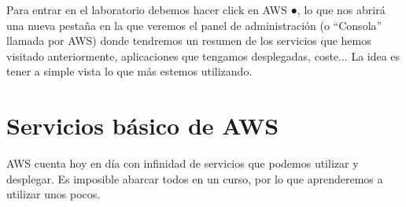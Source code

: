 Para entrar en el laboratorio debemos hacer click en {AWS \color{green}●}, lo que nos abrirá una nueva pestaña en la que veremos el panel de administración (o “Consola” llamada por AWS) donde tendremos un resumen de los servicios que hemos visitado anteriormente, aplicaciones que tengamos desplegadas, coste... La idea es tener a simple vista lo que más estemos utilizando.


\chapter{Servicios básico de AWS}

AWS cuenta hoy en día con infinidad de servicios que podemos utilizar y desplegar. Es imposible abarcar todos en un curso, por lo que aprenderemos a utilizar unos pocos.